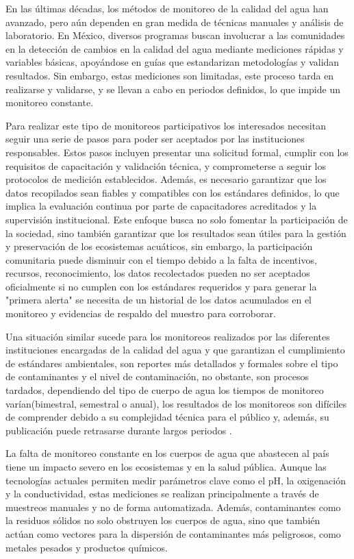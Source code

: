 
En las últimas décadas, los métodos de monitoreo de la calidad del agua han avanzado, pero aún dependen en gran medida de técnicas manuales y análisis de laboratorio. En México, diversos programas buscan involucrar a las comunidades en la detección de cambios en la calidad del agua mediante mediciones rápidas y variables básicas, apoyándose en guías que estandarizan metodologías y validan resultados. Sin embargo, estas mediciones son limitadas, este proceso tarda en realizarse y validarse, y se llevan a cabo en periodos definidos, lo que impide un monitoreo constante.


Para realizar este tipo de monitoreos participativos los interesados necesitan seguir una serie de pasos para poder ser aceptados por las instituciones responsables. Estos pasos incluyen presentar una solicitud formal, cumplir con los requisitos de capacitación y validación técnica, y comprometerse a seguir los protocolos de medición establecidos. Además, es necesario garantizar que los datos recopilados sean fiables y compatibles con los estándares definidos, lo que implica la evaluación continua por parte de capacitadores acreditados y la supervisión institucional. Este enfoque busca no solo fomentar la participación de la sociedad, sino también garantizar que los resultados sean útiles para la gestión y preservación de los ecosistemas acuáticos, sin embargo, la participación comunitaria puede disminuir con el tiempo debido a la falta de incentivos, recursos, reconocimiento, los datos recolectados pueden no ser aceptados oficialmente si no cumplen con los estándares requeridos y para generar la "primera alerta" se necesita de un historial de los datos acumulados en el monitoreo y evidencias de respaldo del muestro para corroborar.


Una situación similar sucede para los monitoreos realizados por las diferentes instituciones encargadas de la calidad del agua y que garantizan el cumplimiento de estándares ambientales, son reportes más detallados y formales sobre el tipo de contaminantes y el nivel de contaminación, no obstante, son procesos tardados, dependiendo del tipo de cuerpo de agua los tiempos de monitoreo varían(bimestral, semestral o anual), los resultados de los monitoreos son difíciles de comprender debido a su complejidad técnica para el público y, además, su publicación puede retrasarse durante largos periodos \cite{guiaMonitoreo2024}.


La falta de monitoreo constante en los cuerpos de agua que abastecen al país tiene un impacto severo en los ecosistemas y en la salud pública. Aunque las tecnologías actuales permiten medir parámetros clave como el pH, la oxigenación y la conductividad, estas mediciones se realizan principalmente a través de muestreos manuales y no de forma automatizada. Además, contaminantes como la residuos sólidos no solo obstruyen los cuerpos de agua, sino que también actúan como vectores para la dispersión de contaminantes más peligrosos, como metales pesados y productos químicos.

